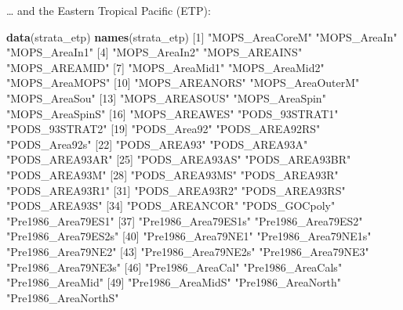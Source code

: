 \documentclass[
]{book}
\newenvironment{Shaded}{\begin{snugshade}}{\end{snugshade}}
\newcommand{\DecValTok}[1]{\textcolor[rgb]{0.00,0.00,0.81}{#1}}
\newcommand{\KeywordTok}[1]{\textcolor[rgb]{0.13,0.29,0.53}{\textbf{#1}}}
\newcommand{\NormalTok}[1]{#1}
\newcommand{\StringTok}[1]{\textcolor[rgb]{0.31,0.60,0.02}{#1}}
\begin{document}
\ldots{} and the Eastern Tropical Pacific (ETP):

\begin{Shaded}
\begin{Highlighting}[]
\KeywordTok{data}\NormalTok{(strata_etp) }
\KeywordTok{names}\NormalTok{(strata_etp)}
\NormalTok{ [}\DecValTok{1}\NormalTok{] }\StringTok{"MOPS_AreaCoreM"}     \StringTok{"MOPS_AreaIn"}        \StringTok{"MOPS_AreaIn1"}      
\NormalTok{ [}\DecValTok{4}\NormalTok{] }\StringTok{"MOPS_AreaIn2"}       \StringTok{"MOPS_AREAINS"}       \StringTok{"MOPS_AREAMID"}      
\NormalTok{ [}\DecValTok{7}\NormalTok{] }\StringTok{"MOPS_AreaMid1"}      \StringTok{"MOPS_AreaMid2"}      \StringTok{"MOPS_AreaMOPS"}     
\NormalTok{[}\DecValTok{10}\NormalTok{] }\StringTok{"MOPS_AREANORS"}      \StringTok{"MOPS_AreaOuterM"}    \StringTok{"MOPS_AreaSou"}      
\NormalTok{[}\DecValTok{13}\NormalTok{] }\StringTok{"MOPS_AREASOUS"}      \StringTok{"MOPS_AreaSpin"}      \StringTok{"MOPS_AreaSpinS"}    
\NormalTok{[}\DecValTok{16}\NormalTok{] }\StringTok{"MOPS_AREAWES"}       \StringTok{"PODS_93STRAT1"}      \StringTok{"PODS_93STRAT2"}     
\NormalTok{[}\DecValTok{19}\NormalTok{] }\StringTok{"PODS_Area92"}        \StringTok{"PODS_AREA92RS"}      \StringTok{"PODS_Area92s"}      
\NormalTok{[}\DecValTok{22}\NormalTok{] }\StringTok{"PODS_AREA93"}        \StringTok{"PODS_AREA93A"}       \StringTok{"PODS_AREA93AR"}     
\NormalTok{[}\DecValTok{25}\NormalTok{] }\StringTok{"PODS_AREA93AS"}      \StringTok{"PODS_AREA93BR"}      \StringTok{"PODS_AREA93M"}      
\NormalTok{[}\DecValTok{28}\NormalTok{] }\StringTok{"PODS_AREA93MS"}      \StringTok{"PODS_AREA93R"}       \StringTok{"PODS_AREA93R1"}     
\NormalTok{[}\DecValTok{31}\NormalTok{] }\StringTok{"PODS_AREA93R2"}      \StringTok{"PODS_AREA93RS"}      \StringTok{"PODS_AREA93S"}      
\NormalTok{[}\DecValTok{34}\NormalTok{] }\StringTok{"PODS_AREANCOR"}      \StringTok{"PODS_GOCpoly"}       \StringTok{"Pre1986_Area79ES1"} 
\NormalTok{[}\DecValTok{37}\NormalTok{] }\StringTok{"Pre1986_Area79ES1s"} \StringTok{"Pre1986_Area79ES2"}  \StringTok{"Pre1986_Area79ES2s"}
\NormalTok{[}\DecValTok{40}\NormalTok{] }\StringTok{"Pre1986_Area79NE1"}  \StringTok{"Pre1986_Area79NE1s"} \StringTok{"Pre1986_Area79NE2"} 
\NormalTok{[}\DecValTok{43}\NormalTok{] }\StringTok{"Pre1986_Area79NE2s"} \StringTok{"Pre1986_Area79NE3"}  \StringTok{"Pre1986_Area79NE3s"}
\NormalTok{[}\DecValTok{46}\NormalTok{] }\StringTok{"Pre1986_AreaCal"}    \StringTok{"Pre1986_AreaCals"}   \StringTok{"Pre1986_AreaMid"}   
\NormalTok{[}\DecValTok{49}\NormalTok{] }\StringTok{"Pre1986_AreaMidS"}   \StringTok{"Pre1986_AreaNorth"}  \StringTok{"Pre1986_AreaNorthS"}

\end{Highlighting}
\end{Shaded}
\end{document}

